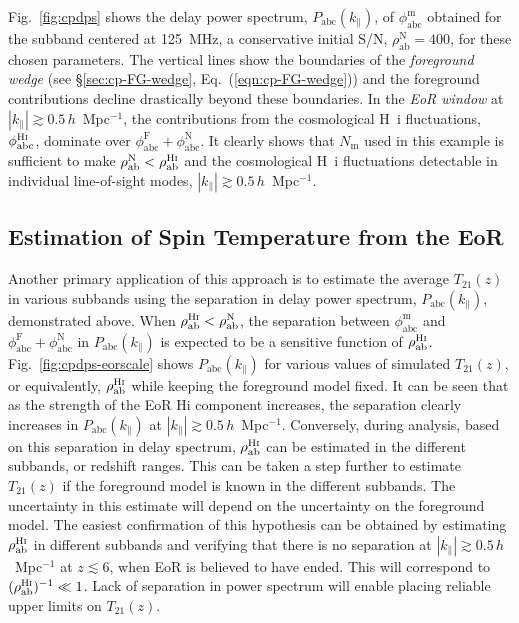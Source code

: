 \documentclass[
reprint,
superscriptaddress,
amsmath,
amssymb,
aps,
]{revtex4-1}
\begin{document}
Fig.~\ref{fig:cpdps} shows the delay power spectrum, $P_\textrm{abc}(k_\parallel)$, of $\phi_\textrm{abc}^\textrm{m}$ obtained for the subband centered at 125~MHz, a conservative initial S/N, $\rho_\textrm{ab}^\textrm{N}=400$,  for these chosen parameters. The vertical lines show the boundaries of the {\it foreground wedge} (see \S\ref{sec:cp-FG-wedge}, Eq.~(\ref{eqn:cp-FG-wedge})) and the foreground contributions decline drastically beyond these boundaries. In the {\it EoR window} at $|k_\parallel| \gtrsim 0.5\,h$~Mpc$^{-1}$, the contributions from the cosmological H~{\sc i} fluctuations, $\phi_\textrm{abc}^\textrm{H{\sc i}}$, dominate over $\phi_\textrm{abc}^\textrm{F} + \phi_\textrm{abc}^\textrm{N}$. It clearly shows that $N_\textrm{m}$ used in this example is sufficient to make $\rho_\textrm{ab}^\textrm{N} < \rho_\textrm{ab}^\textrm{H{\sc i}}$ and the cosmological H~{\sc i} fluctuations detectable in individual line-of-sight modes, $|k_\parallel| \gtrsim 0.5\,h$~Mpc$^{-1}$. 

\subsection{Estimation of Spin Temperature from the EoR}\label{sec:spin-temp}

Another primary application of this approach is to estimate the average $T_{21}(z)$ in various subbands using the separation in delay power spectrum, $P_\textrm{abc}(k_\parallel)$, demonstrated above. When $\rho_\textrm{ab}^\textrm{H{\sc i}} < \rho_\textrm{ab}^\textrm{N}$, the separation between $\phi_\textrm{abc}^\textrm{m}$ and $\phi_\textrm{abc}^\textrm{F} + \phi_\textrm{abc}^\textrm{N}$ in $P_\textrm{abc}(k_\parallel)$ is expected to be a sensitive function of $\rho_\textrm{ab}^\textrm{H{\sc i}}$. Fig.~\ref{fig:cpdps-eorscale} shows $P_\textrm{abc}(k_\parallel)$ for various values of simulated $T_{21}(z)$, or equivalently, $\rho_\textrm{ab}^\textrm{H{\sc i}}$ while keeping the foreground model fixed. It can be seen that as the strength of the EoR H{\sc i} component increases, the separation clearly increases in $P_\textrm{abc}(k_\parallel)$ at $|k_\parallel| \gtrsim 0.5\,h$~Mpc$^{-1}$. Conversely, during analysis, based on this separation in delay spectrum, $\rho_\textrm{ab}^\textrm{H{\sc i}}$ can be estimated in the different subbands, or redshift ranges. This can be taken a step further to estimate $T_{21}(z)$ if the foreground model is known in the different subbands. The uncertainty in this estimate will depend on the uncertainty on the foreground model. The easiest confirmation of this hypothesis can be obtained by estimating $\rho_\textrm{ab}^\textrm{H{\sc i}}$ in different subbands and verifying that there is no separation at $|k_\parallel| \gtrsim 0.5\,h$~Mpc$^{-1}$ at $z\lesssim 6$, when EoR is believed to have ended. This will correspond to $(\rho_\textrm{ab}^\textrm{H{\sc i}})^{-1} \ll 1$. Lack of separation in power spectrum will enable placing reliable upper limits on $T_{21}(z)$.
\end{document}

